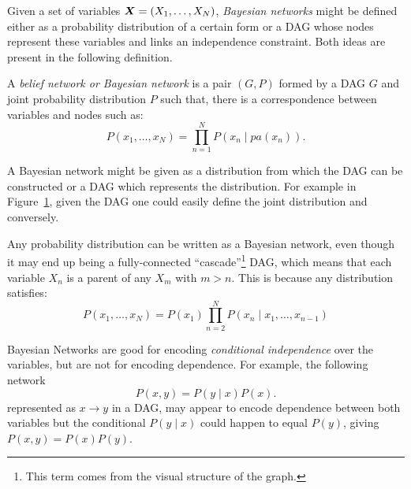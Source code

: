 
Given a set of variables \(\bm{X} = (X_{1},\dots,X_{N})\), \emph{Bayesian networks} might be defined either as a probability distribution of a certain form or a DAG whose nodes represent these variables and links an independence constraint. Both ideas are present in the following definition.

\begin{definition}
  A \emph{belief network or Bayesian network} is a pair \((G,P)\) formed by a DAG \(G\) and  joint probability distribution \(P\) such that, there is a correspondence between variables and nodes such as:
  \[
    P(x_{1},\dots,x_{N}) = \prod_{n=1}^{N}P(x_{n}\mid pa(x_{n})).
  \]
\end{definition}

\begin{remark}
  A Bayesian network might be given as a distribution from which the DAG can be constructed or a DAG which represents the distribution. For example in Figure~\ref{fig:bn_example}, given the DAG one could easily define the joint distribution and conversely.
\end{remark}

\begin{figure}[h!]
  \centering
    \label{fig:bn_example}
\end{figure}

Any probability distribution can be written as a Bayesian network, even though
it may end up being a fully-connected ``cascade''\footnote{This term comes from the visual structure of the graph.} DAG, which means that each variable \( X_n \) is a parent of any \( X_m \) with \( m > n \). This is because any distribution satisfies:
\[
   P(x_1, \dots, x_{N}) = P(x_1) \prod_{n=2}^{N}P(x_{n} \mid x_{1},\dots, x_{n-1})
 \]

Bayesian Networks are good for encoding \emph{conditional independence} over the
variables, but are not for encoding dependence. For example, the following
network
\[
P(x,y) = P(y\mid x)P(x).
\]
represented as \(x \to y\) in a DAG, may appear to encode dependence between both variables but the conditional \(P(y\mid x)\) could happen to equal \(P(y)\), giving \(P(x,y) = P(x)P(y)\).

